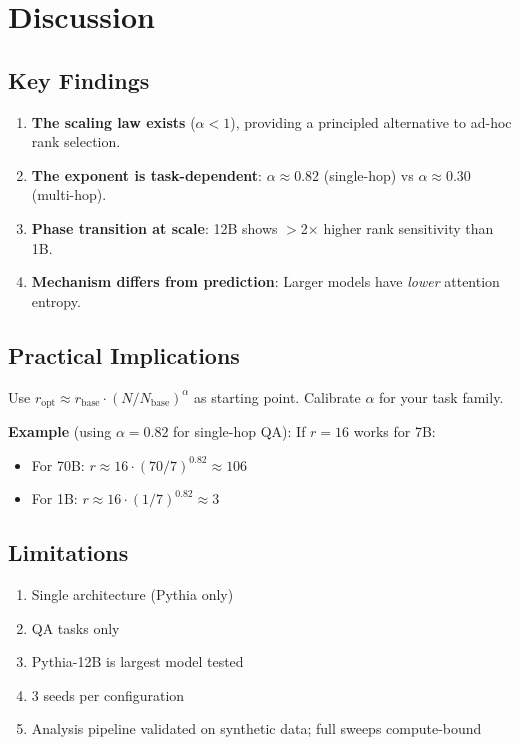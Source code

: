\section{Discussion}

\subsection{Key Findings}

\begin{enumerate}
    \item \textbf{The scaling law exists} ($\alpha < 1$), providing a principled alternative to ad-hoc rank selection.
    \item \textbf{The exponent is task-dependent}: $\alpha \approx 0.82$ (single-hop) vs $\alpha \approx 0.30$ (multi-hop).
    \item \textbf{Phase transition at scale}: 12B shows $>$2$\times$ higher rank sensitivity than 1B.
    \item \textbf{Mechanism differs from prediction}: Larger models have \emph{lower} attention entropy.
\end{enumerate}

\subsection{Practical Implications}

Use $r_{\text{opt}} \approx r_{\text{base}} \cdot (N/N_{\text{base}})^\alpha$ as starting point. Calibrate $\alpha$ for your task family.

\textbf{Example} (using $\alpha = 0.82$ for single-hop QA): If $r=16$ works for 7B:
\begin{itemize}
    \item For 70B: $r \approx 16 \cdot (70/7)^{0.82} \approx 106$
    \item For 1B: $r \approx 16 \cdot (1/7)^{0.82} \approx 3$
\end{itemize}

\subsection{Limitations}

\begin{enumerate}
    \item Single architecture (Pythia only)
    \item QA tasks only
    \item Pythia-12B is largest model tested
    \item 3 seeds per configuration
    \item Analysis pipeline validated on synthetic data; full sweeps compute-bound
\end{enumerate}
